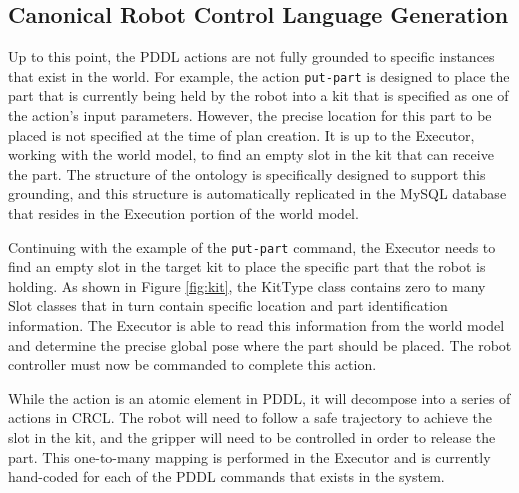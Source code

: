 \subsection{Canonical Robot Control Language Generation}
Up to this point, the PDDL actions are not fully grounded to specific instances
that exist in the world. For example, the action \texttt{put-part} is designed
to place the part that is currently being held by the robot into a kit that
is specified as one of the action's input parameters. However, the precise
location for this part to be placed is not specified at the time of plan
creation. It is up to the Executor, working with the world model, to find
an empty slot in the kit that can receive the part. The structure of the
ontology is specifically designed to support this grounding, and this
structure is automatically replicated in the MySQL database that resides
in the Execution portion of the world model. 

Continuing with
the example of the \texttt{put-part} command, the Executor needs to find
an empty slot in the target kit to place the specific part that the robot is
holding. As shown in Figure \ref{fig:kit}, the {\sc KitType} class contains
zero to many {\sc Slot} classes that in turn contain specific location and 
part identification information. The Executor is able to read this information
from the world model and determine the precise global pose where the part
should be placed. The robot controller must now be commanded to complete this action.

While the action is an atomic element in PDDL, it will decompose into a series
of actions in CRCL. The robot will need to follow a safe trajectory to achieve
the slot in the kit, and the gripper will need to be controlled in order to release
the part. This one-to-many mapping is performed in the Executor and is currently
hand-coded for each of the PDDL commands that exists in the system. 
%
